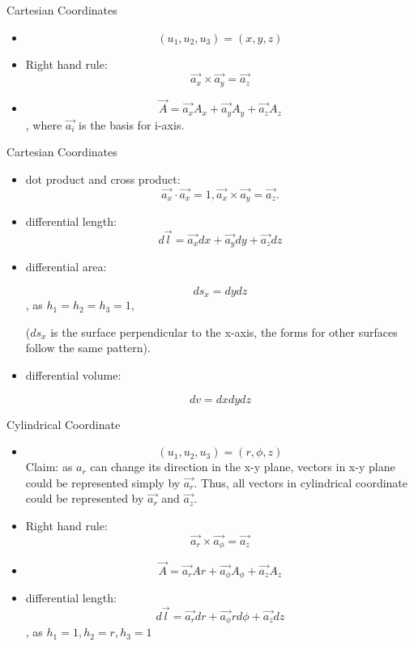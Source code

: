 \documentclass[xcolor={dvipsnames}]{beamer}
\begin{document}
\begin{frame}{Cartesian Coordinates}
\begin{itemize}
    \item $$(u_1, u_2, u_3) = (x, y, z)$$
    \item Right hand rule:
    $$
    \vec{a_x}\times\vec{a_y} = \vec{a_z}
    $$
    \item 
    $$
    \vec{A} = \vec{a_x}A_x + \vec{a_y}A_y + \vec{a_z}A_z
    $$,
    where $\vec{a_i}$ is the basis for i-axis.
    

\end{itemize}
\end{frame}
\begin{frame}{Cartesian Coordinates}
\begin{itemize}
	\item dot product and cross product:
	$$\vec{a_x}\cdot\vec{a_x}=1,\vec{a_x}\times\vec{a_y}=\vec{a_z}.$$
    \item differential length:
    \begin{equation}\label{Eq: cartesian-differential-length}
        d\vec{l} = \vec{a_x}dx + \vec{a_y}dy + \vec{a_z}dz
    \end{equation}
    \item differential area:

    $$
    ds_x = dydz
    $$,
    as $h_1 = h_2 = h_3 = 1$,

    ($ds_x$ is the surface perpendicular to the x-axis, the forms for other surfaces follow the same pattern).
    \item differential volume:

    $$
    dv=dxdydz
    $$
\end{itemize}
\end{frame}
\begin{frame}{Cylindrical Coordinate}
\begin{itemize}
    \item $$(u_1, u_2, u_3) = (r, \phi, z)$$
    Claim: as $a_r$ can change its direction in the x-y plane, vectors in x-y plane could be represented simply by $\vec{a_r}$. Thus, all vectors in cylindrical coordinate could be represented by $\vec{a_r}$ and $\vec{a_z}$.

    \item Right hand rule: 
    $$\vec{a_r}\times\vec{a_\phi}=\vec{a_z}$$
    \item $$\vec{A} = \vec{a_r}Ar + \vec{a_\phi}A_\phi + \vec{a_z}A_z$$
    \item differential length:
    \begin{equation}\label{Eq: cylindrical-differential-length}
        d\vec{l} = \vec{a_r}dr + \vec{a_\phi}rd\phi + \vec{a_z}dz
    \end{equation},
    as $h_1 = 1, h_2 = r, h_3 = 1$
\end{itemize}
\end{frame}
\end{document}
